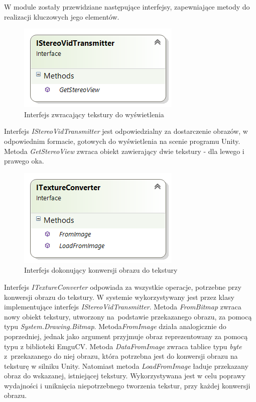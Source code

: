 \documentclass[a4paper,11pt,twoside]{report}
\theoremstyle{definition}
\begin{document}
W module zostały przewidziane następujące interfejsy, zapewniające metody do realizacji kluczowych jego elementów.

\begin{figure}[h]
\centering
\includegraphics[scale=0.9]{images/IStereoVidTransmitter}
\caption[Przekazywanie diagram]{Interfejs zwracający tekstury do wyświetlenia}
\end{figure}

Interfejs \textit{IStereoVidTransmitter} jest odpowiedzialny za dostarczenie obrazów, w odpowiednim formacie, gotowych do wyświetlenia na scenie programu Unity. Metoda \textit{GetStereoView} zwraca obiekt zawierający dwie tekstury - dla lewego i prawego oka. 

\begin{figure}[h]
\centering
\includegraphics[scale=0.9]{images/ITextureConverter}
\caption[Konwersja diagram]{Interfejs dokonujący konwersji obrazu do tekstury}
\end{figure}

Interfejs \textit{ITextureConverter} odpowiada za wszystkie operacje, potrzebne przy konwersji obrazu do tekstury. W systemie wykorzystywany jest przez klasy implementujące interfejs \textit{IStereoVidTransmitter}. Metoda \textit{FromBitmap} zwraca nowy obiekt tekstury, utworzony na~podstawie przekazanego obrazu, za pomocą typu \textit{System.Drawing.Bitmap}. Metoda\textit{FromImage} działa analogicznie do poprzedniej, jednak jako argument przyjmuje obraz reprezentowany za pomocą typu z biblioteki EmguCV.
Metoda \textit{DataFromImage} zwraca tablice typu \textit{byte} z~przekazanego do niej obrazu, która potrzebna jest do konwersji obrazu na teksturę w silniku Unity. Natomiast metoda \textit{LoadFromImage}  ładuje przekazany obraz do wskazanej, istniejącej tekstury. Wykorzystywana jest w celu poprawy wydajności i uniknięcia niepotrzebnego tworzenia tekstur, przy każdej konwersji obrazu.
\end{document}
